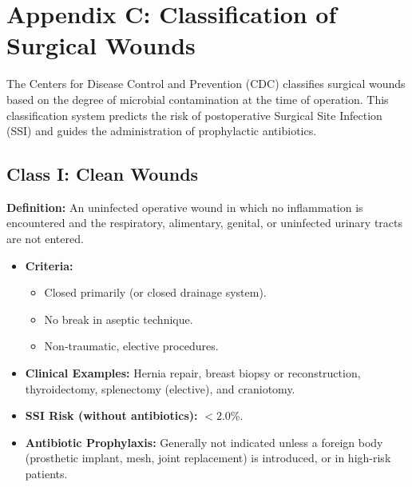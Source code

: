 \chapter*{Appendix C: Classification of Surgical Wounds}

The Centers for Disease Control and Prevention (CDC) classifies surgical wounds based on the degree of microbial contamination at the time of operation. This classification system predicts the risk of postoperative Surgical Site Infection (SSI) and guides the administration of prophylactic antibiotics.

\section*{Class I: Clean Wounds}
\textbf{Definition:} An uninfected operative wound in which no inflammation is encountered and the respiratory, alimentary, genital, or uninfected urinary tracts are not entered.
\begin{itemize}
  \item \textbf{Criteria:}
  \begin{itemize}
    \item Closed primarily (or closed drainage system).
    \item No break in aseptic technique.
    \item Non-traumatic, elective procedures.
  \end{itemize}
  \item \textbf{Clinical Examples:} Hernia repair, breast biopsy or reconstruction, thyroidectomy, splenectomy (elective), and craniotomy.
  \item \textbf{SSI Risk (without antibiotics):} $<2.0\%$.
  \item \textbf{Antibiotic Prophylaxis:} Generally not indicated unless a foreign body (prosthetic implant, mesh, joint replacement) is introduced, or in high-risk patients.
\end{itemize}

